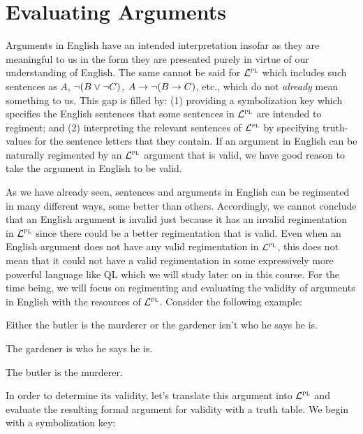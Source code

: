 



\section{Evaluating Arguments}
  \label{sec:Evaluating}

Arguments in English have an intended interpretation insofar as they are meaningful to us in the form they are presented purely in virtue of our understanding of English.
The same cannot be said for $\mathcal{L}^{\textsc{pl}}$ which includes such sentences as $A$, $\neg (B \vee \neg C)$, $A \rightarrow \neg (B \rightarrow C)$, etc., which do not \textit{already} mean something to us.
This gap is filled by: (1) providing a symbolization key which specifies the English sentences that some sentences in $\mathcal{L}^{\textsc{pl}}$ are intended to regiment; and (2) interpreting the relevant sentences of $\mathcal{L}^{\textsc{pl}}$ by specifying truth-values for the sentence letters that they contain.
If an argument in English can be naturally regimented by an $\mathcal{L}^{\textsc{pl}}$ argument that is valid, we have good reason to take the argument in English to be valid.

As we have already seen, sentences and arguments in English can be regimented in many different ways, some better than others.
Accordingly, we cannot conclude that an English argument is invalid just because it has an invalid regimentation in $\mathcal{L}^{\textsc{pl}}$ since there could be a better regimentation that is valid.
Even when an English argument does not have any valid regimentation in $\mathcal{L}^{\textsc{pl}}$, this does not mean that it could not have a valid regimentation in some expressively more powerful language like QL which we will study later on in this course.
For the time being, we will focus on regimenting and evaluating the validity of arguments in English with the resources of $\mathcal{L}^{\textsc{pl}}$.
Consider the following example:

\begin{earg}
  \item[] Either the butler is the murderer or the gardener isn't who he says he is. 
  \item[] The gardener is who he says he is.
  \item[\therefore] The butler is the murderer.
\end{earg}

In order to determine its validity, let's translate this argument into $\mathcal{L}^{\textsc{pl}}$ and evaluate the resulting formal argument for validity with a truth table.
We begin with a symbolization key:

